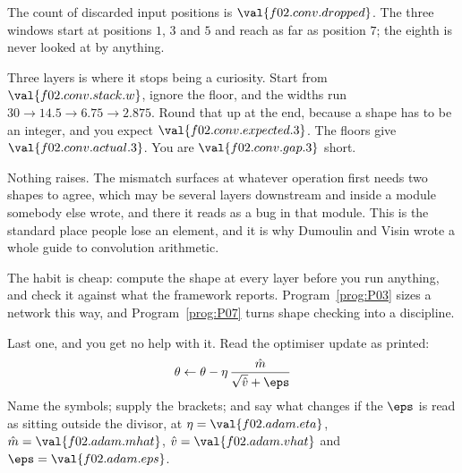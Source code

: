 \begin{fr}
\begin{ansblock}
The count of discarded input positions is $\val{f02.conv.dropped}$. The three
windows start at positions $1$, $3$ and $5$ and reach as far as position $7$;
the eighth is never looked at by anything.

Three layers is where it stops being a curiosity. Start from
$\val{f02.conv.stack.w}$, ignore the floor, and the widths run
$30 \to \num{14.5} \to \num{6.75} \to \num{2.875}$. Round that up at the end,
because a shape has to be an integer, and you expect
$\val{f02.conv.expected.3}$. The floors give $\val{f02.conv.actual.3}$. You are
$\val{f02.conv.gap.3}$ short.
\end{ansblock}

\begin{warning}
Nothing raises. The mismatch surfaces at whatever operation first needs two
shapes to agree, which may be several layers downstream and inside a module
somebody else wrote, and there it reads as a bug in that module. This is the
standard place people lose an element, and it is why Dumoulin and Visin wrote a
whole guide to convolution arithmetic.

The habit is cheap: compute the shape at every layer before you run anything,
and check it against what the framework reports. Program~\ref{prog:P03} sizes a
network this way, and Program~\ref{prog:P07} turns shape checking into a
discipline.
\end{warning}

Last one, and you get no help with it. Read the optimiser update as printed:
\[ \theta \leftarrow \theta - \eta \, \frac{\hat{m}}{\sqrt{\hat{v}} + \eps} \]
Name the symbols; supply the brackets; and say what changes if the $\eps$ is
read as sitting outside the divisor, at $\eta = \val{f02.adam.eta}$,
$\hat{m} = \val{f02.adam.mhat}$, $\hat{v} = \val{f02.adam.vhat}$ and
$\eps = \val{f02.adam.eps}$.
\dotline
\nextframe
\end{fr}

